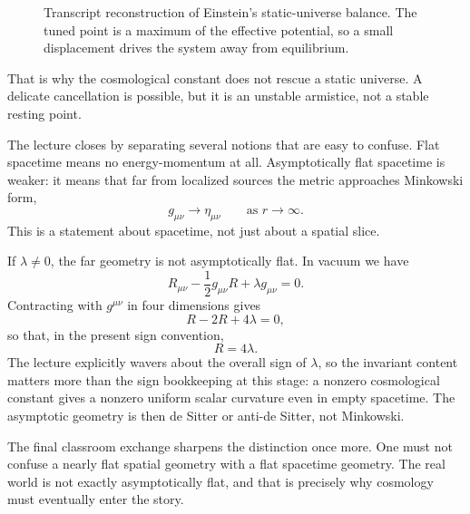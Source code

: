 \begin{figure}
\centering
{}
\caption{Transcript reconstruction of Einstein's static-universe balance. The tuned point is a maximum of the effective potential, so a small displacement drives the system away from equilibrium.}
\end{figure}

That is why the cosmological constant does not rescue a static universe. A delicate cancellation is possible, but it is an unstable armistice, not a stable resting point.

The lecture closes by separating several notions that are easy to confuse. Flat spacetime means no energy-momentum at all. Asymptotically flat spacetime is weaker: it means that far from localized sources the metric approaches Minkowski form,
\begin{equation}
g_{\mu\nu}\to \eta_{\mu\nu}
\qquad \text{as } r\to\infty.
\end{equation}
This is a statement about spacetime, not just about a spatial slice.

If \(\lambda\neq 0\), the far geometry is not asymptotically flat. In vacuum we have
\begin{equation}
R_{\mu\nu}-\frac12 g_{\mu\nu}R+\lambda g_{\mu\nu}=0.
\end{equation}
Contracting with \(g^{\mu\nu}\) in four dimensions gives
\begin{equation}
R-2R+4\lambda=0,
\end{equation}
so that, in the present sign convention,
\begin{equation}
R=4\lambda.
\end{equation}
The lecture explicitly wavers about the overall sign of \(\lambda\), so the invariant content matters more than the sign bookkeeping at this stage: a nonzero cosmological constant gives a nonzero uniform scalar curvature even in empty spacetime. The asymptotic geometry is then de Sitter or anti-de Sitter, not Minkowski.

The final classroom exchange sharpens the distinction once more. One must not confuse a nearly flat spatial geometry with a flat spacetime geometry. The real world is not exactly asymptotically flat, and that is precisely why cosmology must eventually enter the story.

